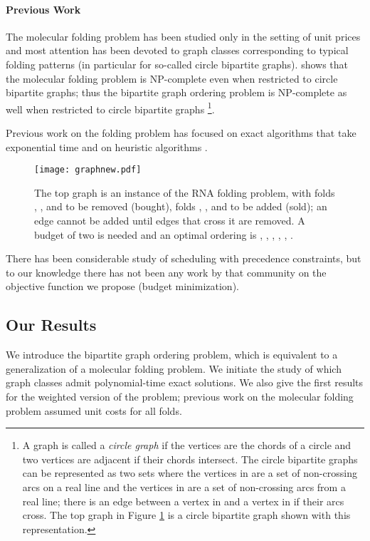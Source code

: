 \documentclass[letterpaper,11pt,abstracton]{scrartcl}
\begin{document}
\paragraph{Previous Work}
The molecular folding problem has been studied only in the
setting of unit prices and most attention has been devoted to graph classes corresponding to typical
folding patterns (in particular for so-called circle bipartite graphs).
\cite{MTSC09} shows that the molecular folding problem is NP-complete
even when restricted to circle bipartite graphs; thus the bipartite graph ordering
problem is NP-complete as well when restricted to circle bipartite graphs
\footnote{ A graph  is called a \emph{circle graph} if the vertices
  are the chords of a circle and two vertices are adjacent if their
  chords intersect.  The circle bipartite graphs can be represented as two
  sets  where the vertices in  are a set of non-crossing arcs
  on a real line and the vertices in  are a set of non-crossing
  arcs from a real line; there is an edge between a vertex in  and
  a vertex in  if their arcs cross.  The top graph in Figure
  \ref{fig:1} is a circle bipartite graph shown with this representation.}.

Previous work on the folding problem has focused on exact algorithms that
take exponential time and on heuristic algorithms \cite{FHMS01}.

\begin{figure}[htbp]
\begin{center}
\texttt{[image: graphnew.pdf]}
\caption{
\footnotesize{
  The top graph is an instance of the RNA folding problem, with folds , ,
  and  to be removed (bought), folds , , and  to be added (sold); an edge cannot
  be added until edges that cross it are removed. A budget of two is needed and an optimal ordering is , , , , , .
}
}
\label{fig:1}
\end{center}
\end{figure}




There has been considerable study of scheduling with precedence constraints,
but to our knowledge there has not been any work by that community on the
objective function we propose (budget minimization).

\subsection{Our Results}

We introduce the bipartite graph ordering problem, which is equivalent to a
generalization of a molecular folding problem.  We initiate the study
of which graph classes admit polynomial-time exact solutions. We also
give the first results for the weighted version of the problem; previous
work on the molecular folding problem assumed unit costs for all folds.
\end{document}

